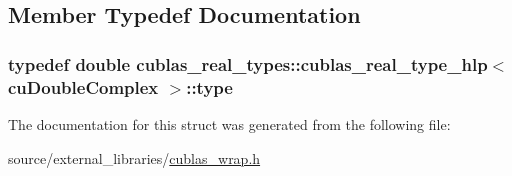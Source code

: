 \subsection{Member Typedef Documentation}
\hypertarget{structcublas__real__types_1_1cublas__real__type__hlp_3_01cuDoubleComplex_01_4_a551952c60dae7ba15565b979aa908d31}{
\subsubsection[{type}]{\setlength{\rightskip}{0pt plus 5cm}typedef double {\bf cublas\-\_\-real\-\_\-types\-::cublas\-\_\-real\-\_\-type\-\_\-hlp}$<$ cu\-Double\-Complex $>$\-::{\bf type}}}\label{structcublas__real__types_1_1cublas__real__type__hlp_3_01cuDoubleComplex_01_4_a551952c60dae7ba15565b979aa908d31}


The documentation for this struct was generated from the following file\-:\begin{DoxyCompactItemize}
\item 
source/external\-\_\-libraries/\hyperlink{cublas__wrap_8h}{cublas\-\_\-wrap.\-h}\end{DoxyCompactItemize}
